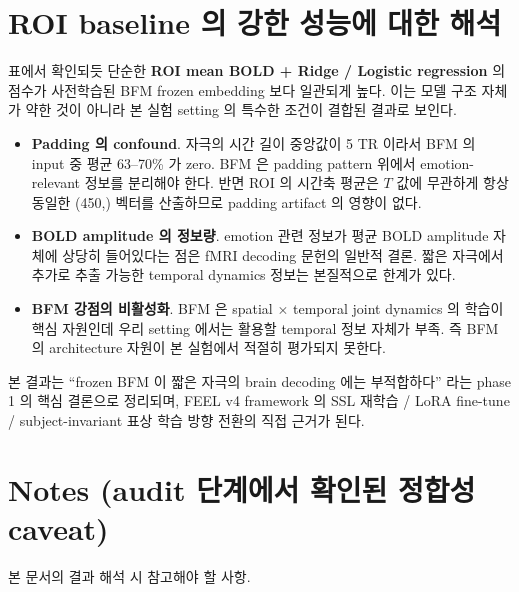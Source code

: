 \documentclass[a4paper,11pt]{article}
\begin{document}










\section{ROI baseline 의 강한 성능에 대한 해석}

표에서 확인되듯 단순한 \textbf{ROI mean BOLD + Ridge / Logistic regression} 의 점수가 사전학습된 BFM frozen embedding 보다 일관되게 높다. 이는 모델 구조 자체가 약한 것이 아니라 본 실험 setting 의 특수한 조건이 결합된 결과로 보인다.

\begin{itemize}[leftmargin=*, itemsep=2pt]
  \item \textbf{Padding 의 confound}. 자극의 시간 길이 중앙값이 5 TR 이라서 BFM 의 input 중 평균 63--70\% 가 zero. BFM 은 padding pattern 위에서 emotion-relevant 정보를 분리해야 한다. 반면 ROI 의 시간축 평균은 $T$ 값에 무관하게 항상 동일한 (450,) 벡터를 산출하므로 padding artifact 의 영향이 없다.
  \item \textbf{BOLD amplitude 의 정보량}. emotion 관련 정보가 평균 BOLD amplitude 자체에 상당히 들어있다는 점은 fMRI decoding 문헌의 일반적 결론. 짧은 자극에서 추가로 추출 가능한 temporal dynamics 정보는 본질적으로 한계가 있다.
  \item \textbf{BFM 강점의 비활성화}. BFM 은 spatial $\times$ temporal joint dynamics 의 학습이 핵심 자원인데 우리 setting 에서는 활용할 temporal 정보 자체가 부족. 즉 BFM 의 architecture 자원이 본 실험에서 적절히 평가되지 못한다.
\end{itemize}

본 결과는 ``frozen BFM 이 짧은 자극의 brain decoding 에는 부적합하다'' 라는 phase 1 의 핵심 결론으로 정리되며, FEEL v4 framework 의 SSL 재학습 / LoRA fine-tune / subject-invariant 표상 학습 방향 전환의 직접 근거가 된다.

\section{Notes (audit 단계에서 확인된 정합성 caveat)}

본 문서의 결과 해석 시 참고해야 할 사항.
\end{document}

